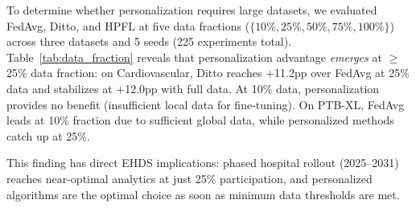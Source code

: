 \documentclass[conference]{IEEEtran}
\begin{document}
To determine whether personalization requires large datasets, we evaluated FedAvg, Ditto, and HPFL at five data fractions ($\{10\%, 25\%, 50\%, 75\%, 100\%\}$) across three datasets and 5 seeds (225 experiments total). Table~\ref{tab:data_fraction} reveals that personalization advantage \textit{emerges} at $\geq$25\% data fraction: on Cardiovascular, Ditto reaches $+$11.2pp over FedAvg at 25\% data and stabilizes at $+$12.0pp with full data. At 10\% data, personalization provides no benefit (insufficient local data for fine-tuning). On PTB-XL, FedAvg leads at 10\% fraction due to sufficient global data, while personalized methods catch up at 25\%.

This finding has direct EHDS implications: phased hospital rollout (2025--2031) reaches near-optimal analytics at just 25\% participation, and personalized algorithms are the optimal choice as soon as minimum data thresholds are met.
\end{document}
